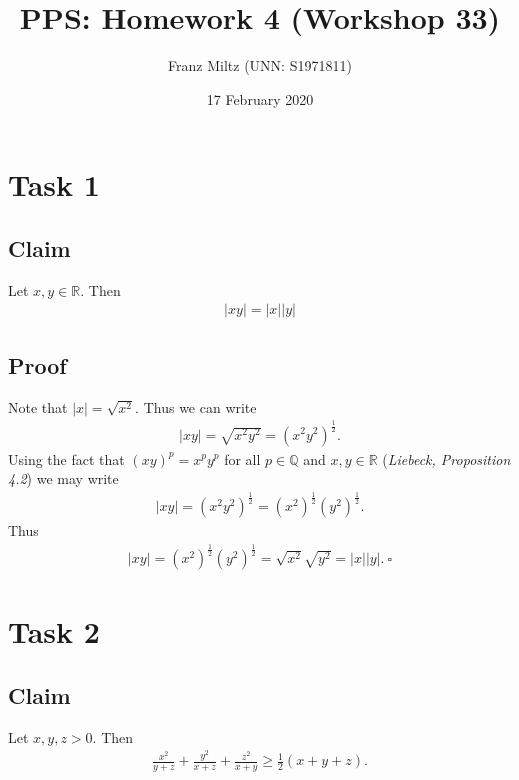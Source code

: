 \documentclass{article}
\title{PPS: Homework 4 (Workshop 33)}
\author{Franz Miltz (UNN: S1971811)}
\date{17 February 2020}
\begin{document}
\maketitle
\section*{Task 1}
\subsection*{Claim}
Let $x,y\in\mathbb{R}$. Then
\begin{align*}
  |xy|=|x||y|
\end{align*}
\subsection*{Proof}
Note that $|x|=\sqrt{x^2}$. Thus we can write
\begin{align*}
  |xy|=\sqrt{x^2y^2}=(x^2y^2)^\frac{1}{2}.
\end{align*}
Using the fact that $(xy)^p=x^py^p$ for all $p\in\mathbb{Q}$ and $x,y\in\mathbb{R}$ (\emph{Liebeck, Proposition 4.2}) we may write
\begin{align*}
  |xy|=(x^2y^2)^\frac{1}{2}=(x^2)^\frac{1}{2}(y^2)^\frac{1}{2}.
\end{align*}
Thus
\begin{align*}
  |xy|=(x^2)^\frac{1}{2}(y^2)^\frac{1}{2}=\sqrt{x^2}\sqrt{y^2}=|x||y|.\:\square
\end{align*}
\section*{Task 2}
\subsection*{Claim} 
Let $x,y,z>0$. Then
\begin{align*}
  \frac{x^2}{y+z}+\frac{y^2}{x+z}+\frac{z^2}{x+y}\geq\frac{1}{2}(x+y+z).
\end{align*}
\end{document}

